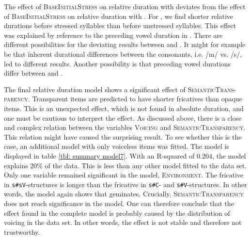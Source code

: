 The effect of \textsc{BaseInitialStress} on relative duration with  deviates from the effect of \textsc{BaseInitialStress} on relative duration with . For , we find shorter relative durations before stressed syllables than before unstressed syllables. This effect was explained by reference to the preceding vowel duration in . There are different possibilities for the deviating results between  and . It might for example be that inherent durational differences between the consonants, i.e. /m/ vs. /s/, led to different results. Another possibility is that preceding vowel durations differ between  and .
          

 The final relative duration model shows a significant effect of \textsc{SemanticTrans-parency}. Transparent items are predicted to have shorter fricatives than opaque items. This is an unexpected effect, which is not found in absolute duration, and one must be cautious to interpret the effect. 
 As discussed above, there is a close and complex relation between the variables \textsc{Voicing} and \textsc{SemanticTransparency}. This relation might have caused the surprising result. To see whether this is the case, an additional model with only voiceless items was fitted. The model is displayed in table \ref{tbl: summary model7}.
 With an R-squared of $0.204$, the model explains 20\% of the data. This is less than any other model fitted to the data set. Only one variable remained significant in the model, \textsc{Environment}. The fricative in \texttt{s\#sV}-structures is longer than the fricative in \texttt{s\#C}- and \texttt{s\#V}-structures. In other words, the model again shows that  geminates. 
 Crucially, \textsc{SemanticTransparency} does not reach significance in the model. One can therefore conclude that the effect found in the complete model is probably caused by the distribution of voicing in the data set. In other words, the effect is not stable and therefore not trustworthy.

